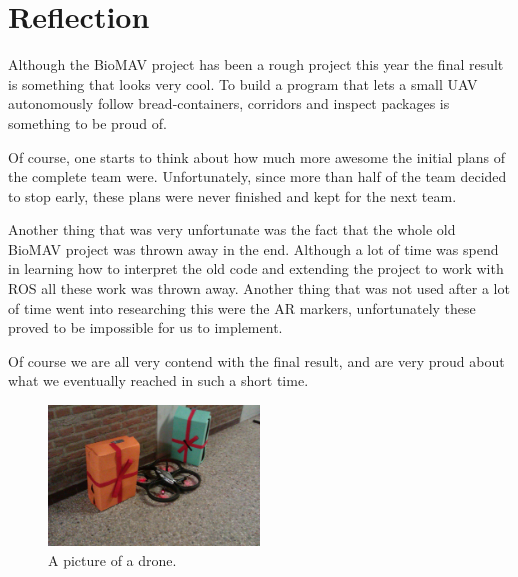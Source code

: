 \documentclass[a4paper,10pt]{article}
\begin{document}
\section{Reflection}
\label{sec:reflection}

Although the BioMAV project has been a rough project this year the final result is something that looks very cool. 
To build a program that lets a small UAV autonomously follow bread-containers, corridors and inspect packages is something to be proud of. 

Of course, one starts to think about how much more awesome the initial plans of the complete team were. 
Unfortunately, since more than half of the team decided to stop early, these plans were never finished and kept for the next team. 

Another thing that was very unfortunate was the fact that the whole old BioMAV project was thrown away in the end. 
Although a lot of time was spend in learning how to interpret the old code and extending the project to work with ROS all these work was thrown away. 
Another thing that was not used after a lot of time went into researching this were the AR markers, unfortunately these proved to be impossible for us to implement. 

Of course we are all very contend with the final result, and are very proud about what we eventually reached in such a short time. 

\begin{figure}[h!]
	\caption{A picture of a drone.}
	\centering
	\includegraphics[width=0.5\textwidth]{images/presentsAndDrone}
\end{figure}


\end{document}
